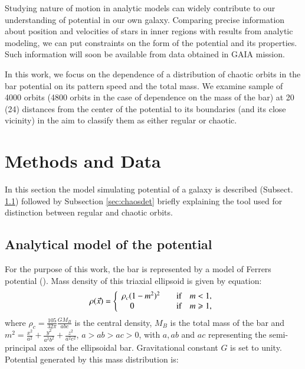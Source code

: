 \documentclass[a4paper,fleqn,usenatbib]{mnras}
\begin{document}
Studying nature of motion in analytic models can widely contribute to our understanding of potential in our own galaxy. Comparing precise information about position and velocities of stars in inner regions with results from analytic modeling, we can put constraints on the form of the potential and its properties. Such information will soon be available from data obtained in GAIA mission.

In this work, we focus on the dependence of a distribution of chaotic orbits in the bar potential on its pattern speed and the total mass. We examine sample of 4000 orbits (4800 orbits in the case of dependence on the mass of the bar) at 20 (24) distances from the center of the potential to its boundaries (and its close vicinity) in the aim to classify them as either regular or chaotic.

\section{Methods and Data}

In this section the model simulating potential of a galaxy is described (Subsect. \ref{sec:potential}) followed by Subsection \ref{sec:chaosdet} briefly explaining the tool used for distinction between regular and chaotic orbits.

\subsection{Analytical model of the potential}
\label{sec:potential} %

For the purpose of this work, the bar is represented by a model of Ferrers potential (\cite{Ferrers:1877}). Mass density of this triaxial ellipsoid is given by equation:
\begin{equation} \label{eq:Ferdens}
\rho(\vec{x}) = \left\{
\begin{array}{l l}
\rho_{c}(1-m^{2})^{2}& \quad \textrm{if} \quad m<1,\\
\quad 0& \quad \textrm{if} \quad m \geq 1,\\
\end{array} \right.
\end{equation}
where $\rho_{c}=\frac{105}{32\pi}\frac{G M_{B}}{abc}$ is the central
density, $M_{B}$ is the total mass of the bar and
$m^{2}=\frac{x^{2}}{a^{2}}+\frac{y^{2}}{a^2b^{2}}+\frac{z^{2}}{a^2c^{2}}$,
\mbox{$a>ab>ac> 0$}, with $a,ab$ and $ac$ representing the semi-principal axes of the ellipsoidal
bar. Gravitational constant $ G $ is set to unity. Potential generated by this mass distribution is:
\end{document}
